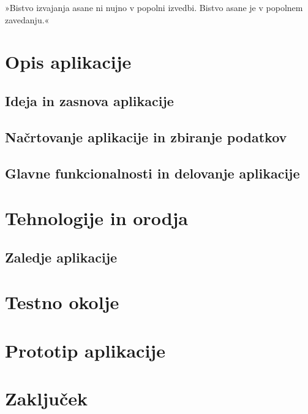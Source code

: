 \documentclass[a4paper, 12pt]{book}
\begin{document}
»Bistvo izvajanja asane ni nujno v popolni izvedbi. Bistvo asane je v popolnem zavedanju.«


\chapter{Opis aplikacije}
\label{ch1}

\section{Ideja in zasnova aplikacije}

\section{Načrtovanje aplikacije in zbiranje podatkov}

\section{Glavne funkcionalnosti in delovanje aplikacije}

\chapter{Tehnologije in orodja}
\label{ch2}

\section{Zaledje aplikacije}


\chapter{Testno okolje}
\label{ch3}


\chapter{Prototip aplikacije}
\label{ch6}


\chapter{Zaključek}
\label{stroka}


\clearpage
{}


\end{document}
